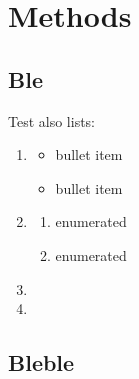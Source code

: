 \documentclass[]{biophysicist}
\begin{document}
\kant[5-6]

\section{Methods}

\subsection{Ble}

\kant[7-8]

Test also lists:

\begin{enumerate}

\item \kant[3]

\begin{itemize}
\item bullet item
\item bullet item
\end{itemize}

\item \kant[6]

\begin{enumerate}
\item enumerated
\item enumerated
\end{enumerate}

\item \kant[4]

\item \kant[5]

\end{enumerate}

\subsection{Bleble}

\kant[9-10]


\kant[11]


\end{document}
